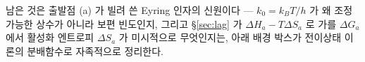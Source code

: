 
남은 것은 출발점 (a) 가 빌려 쓴 Eyring 인자의 신원이다 --- $k_0=k_BT/h$ 가 왜 조정 가능한 상수가 아니라
보편 빈도인지, 그리고 \S\ref{sec:lag} 가 $\Delta H_a-T\Delta S_a$ 로 가를 $\Delta G_a$ 에서 활성화 엔트로피
$\Delta S_a$ 가 미시적으로 무엇인지는, 아래 배경 박스가 전이상태 이론의 분배함수로 자족적으로 정리한다.

